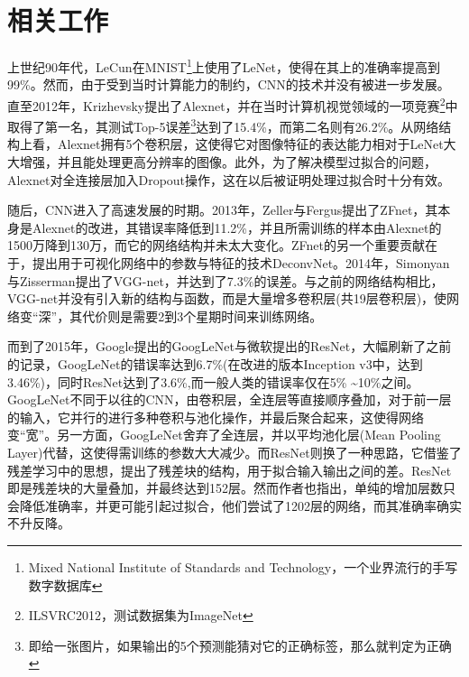 \chapter{相关工作}

上世纪90年代，LeCun在MNIST\footnote{Mixed National Institute of Standards and Technology，一个业界流行的手写数字数据库}上使用了LeNet，使得在其上的准确率提高到99\%。然而，由于受到当时计算能力的制约，CNN的技术并没有被进一步发展。直至2012年，Krizhevsky提出了Alexnet，并在当时计算机视觉领域的一项竞赛\footnote{ILSVRC2012，测试数据集为ImageNet}中取得了第一名，其测试Top-5误差\footnote{即给一张图片，如果输出的5个预测能猜对它的正确标签，那么就判定为正确}达到了15.4\%，而第二名则有26.2\%。从网络结构上看，Alexnet拥有5个卷积层，这使得它对图像特征的表达能力相对于LeNet大大增强，并且能处理更高分辨率的图像。此外，为了解决模型过拟合的问题，Alexnet对全连接层加入Dropout操作，这在以后被证明处理过拟合时十分有效。

随后，CNN进入了高速发展的时期。2013年，Zeller与Fergus提出了ZFnet，其本身是Alexnet的改进，其错误率降低到11.2\%，并且所需训练的样本由Alexnet的1500万降到130万，而它的网络结构并未太大变化。ZFnet的另一个重要贡献在于，提出用于可视化网络中的参数与特征的技术DeconvNet。2014年，Simonyan与Zisserman提出了VGG-net，并达到了7.3\%的误差。与之前的网络结构相比，VGG-net并没有引入新的结构与函数，而是大量增多卷积层(共19层卷积层)，使网络变“深”，其代价则是需要2到3个星期时间来训练网络。

而到了2015年，Google提出的GoogLeNet与微软提出的ResNet，大幅刷新了之前的记录，GoogLeNet的错误率达到6.7\%(在改进的版本Inception v3中，达到3.46\%)，同时ResNet达到了3.6\%,而一般人类的错误率仅在5\% \textasciitilde 10\%之间。GoogLeNet不同于以往的CNN，由卷积层，全连层等直接顺序叠加，对于前一层的输入，它并行的进行多种卷积与池化操作，并最后聚合起来，这使得网络变“宽”。另一方面，GoogLeNet舍弃了全连层，并以平均池化层(Mean Pooling Layer)代替，这使得需训练的参数大大减少。而ResNet则换了一种思路，它借鉴了残差学习中的思想，提出了残差块的结构，用于拟合输入输出之间的差。ResNet即是残差块的大量叠加，并最终达到152层。然而作者也指出，单纯的增加层数只会降低准确率，并更可能引起过拟合，他们尝试了1202层的网络，而其准确率确实不升反降。
